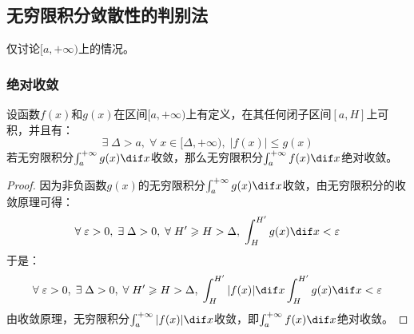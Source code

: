 \subsection{无穷限积分敛散性的判别法}
仅讨论$[a,+\infty)$上的情况。
\subsubsection{绝对收敛}
\begin{theorem}
	设函数$f(x)$和$g(x)$在区间$[a,+\infty)$上有定义，在其任何闭子区间$[a,H]$上可积，并且有：
	\begin{equation*}
		\exists\;\Delta>a,\;\forall\;x\in[\Delta,+\infty),\;|f(x)|\leqslant g(x)
	\end{equation*}
	若无穷限积分$\int_{a}^{+\infty}g(x)\dif x$收敛，那么无穷限积分$\int_{a}^{+\infty}f(x)\dif x$绝对收敛。
\end{theorem}
\begin{proof}
	因为非负函数$g(x)$的无穷限积分$\int_{a}^{+\infty}g(x)\dif x$收敛，由无穷限积分的收敛原理可得：
	\begin{equation*}
		\forall\;\varepsilon>0,\;\exists\;\Delta>0,\;\forall\;H'\geqslant H>\Delta,\;\int_{H}^{H'}g(x)\dif x<\varepsilon
	\end{equation*}
	于是：
	\begin{equation*}
		\forall\;\varepsilon>0,\;\exists\;\Delta>0,\;\forall\;H'\geqslant H>\Delta,\;\int_{H}^{H'}|f(x)|\dif x\int_{H}^{H'}g(x)\dif x<\varepsilon
	\end{equation*}
	由收敛原理，无穷限积分$\int_{a}^{+\infty}|f(x)|\dif x$收敛，即$\int_{a}^{+\infty}f(x)\dif x$绝对收敛。
\end{proof}
